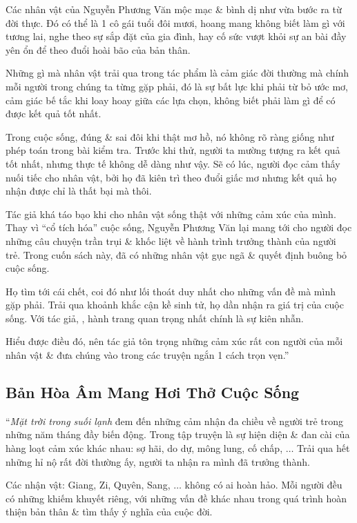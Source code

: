 \documentclass[oneside]{book}
\numberwithin{equation}{section}
\begin{document}
Các nhân vật của Nguyễn Phương Văn mộc mạc \& bình dị như vừa bước ra từ đời thực. Đó có thể là 1 cô gái tuổi đôi mươi, hoang mang không biết làm gì với tương lai, nghe theo sự sắp đặt của gia đình, hay cố sức vượt khỏi sự an bài đầy yên ổn để theo đuổi hoài bão của bản thân.

Những gì mà nhân vật trải qua trong tác phẩm là cảm giác đời thường mà chính mỗi người trong chúng ta từng gặp phải, đó là sự bất lực khi phải từ bỏ ước mơ, cảm giác bế tắc khi loay hoay giữa các lựa chọn, không biết phải làm gì để có được kết quả tốt nhất.

Trong cuộc sống, đúng \& sai đôi khi thật mơ hồ, nó không rõ ràng giống như phép toán trong bài kiểm tra. Trước khi thử, người ta mường tượng ra kết quả tốt nhất, nhưng thực tế không dễ dàng như vậy. Sẽ có lúc, người đọc cảm thấy nuối tiếc cho nhân vật, bởi họ đã kiên trì theo đuổi giấc mơ nhưng kết quả họ nhận được chỉ là thất bại mà thôi.

Tác giả khá táo bạo khi cho nhân vật sống thật với những cảm xúc của mình. Thay vì ``cổ tích hóa'' cuộc sống, Nguyễn Phương Văn lại mang tới cho người đọc những câu chuyện trần trụi \& khốc liệt về hành trình trưởng thành của người trẻ. Trong cuốn sách này, đã có những nhân vật gục ngã \& quyết định buông bỏ cuộc sống.

Họ tìm tới cái chết, coi đó như lối thoát duy nhất cho những vấn đề mà mình gặp phải. Trải qua khoảnh khắc cận kề sinh tử, họ dần nhận ra giá trị của cuộc sống. Với tác giả, , hành trang quan trọng nhất chính là sự kiên nhẫn.

 Hiểu được điều đó, nên tác giả tôn trọng những cảm xúc rất con người của mỗi nhân vật \& đưa chúng vào trong các truyện ngắn 1 cách trọn vẹn.''

\subsection{Bản Hòa Âm Mang Hơi Thở Cuộc Sống}
``\textit{Mặt trời trong suối lạnh} đem đến những cảm nhận đa chiều về người trẻ trong những năm tháng đầy biến động. Trong tập truyện là sự hiện diện \& đan cài của hàng loạt cảm xúc khác nhau: sợ hãi, do dự, mông lung, cố chấp, $\ldots$ Trải qua hết những hỉ nộ rất đời thường ấy, người ta nhận ra mình đã trưởng thành.

Các nhận vật: Giang, Zi, Quyên, Sang, $\ldots$ không có ai hoàn hảo. Mỗi người đều có những khiếm khuyết riêng, với những vấn đề khác nhau trong quá trình hoàn thiện bản thân \& tìm thấy ý nghĩa của cuộc đời.
\end{document}
